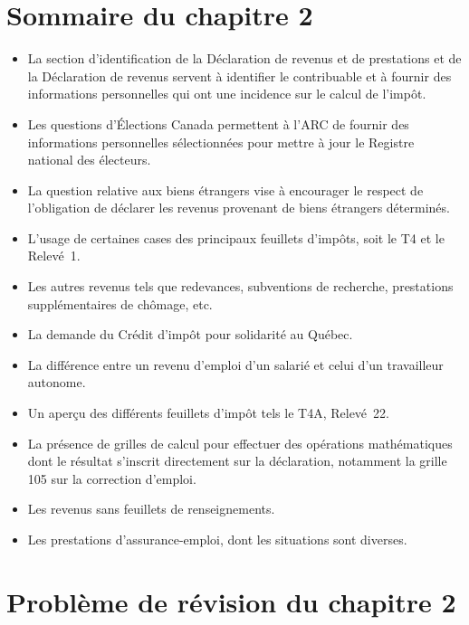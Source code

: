 \section{Sommaire du chapitre 2}
\begin{itemize}
	\item La section d'identification de la Déclaration de revenus et de prestations et de la Déclaration de revenus servent à identifier le contribuable et à fournir des informations personnelles qui ont une incidence sur le calcul de l'impôt.
	\item Les questions d'Élections Canada permettent à l'ARC de fournir des informations personnelles sélectionnées pour mettre à jour le Registre national des électeurs.
	\item La question relative aux biens étrangers vise à encourager le respect de l'obligation de déclarer les revenus provenant de biens étrangers déterminés.
	\item L'usage de certaines cases des principaux feuillets d'impôts, soit le T4 et le Relevé~1.
	\item Les autres revenus tels que redevances, subventions de recherche, prestations supplémentaires de chômage, etc.
	\item La demande du Crédit d'impôt pour solidarité au Québec.
	\item La différence entre un revenu d'emploi d'un salarié et celui d'un travailleur autonome.
	\item Un aperçu des différents feuillets d'impôt tels le T4A, Relevé~22.
	\item La présence de grilles de calcul pour effectuer des opérations mathématiques dont le résultat s'inscrit directement sur la déclaration, notamment la grille 105 sur la correction d'emploi.
	\item Les revenus sans feuillets de renseignements. 
	\item Les prestations d'assurance-emploi, dont les situations sont diverses.
\end{itemize}



\section{Problème de révision du chapitre 2}
